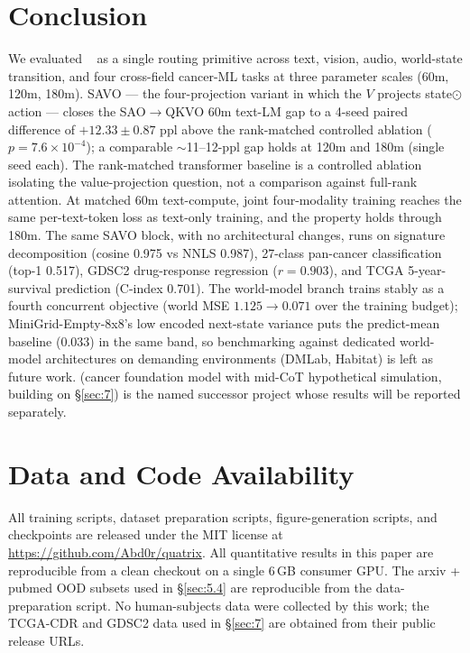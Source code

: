 \section{Conclusion}\label{sec:8}

We evaluated \QC{}~\cite{ref1} as a single routing primitive across text, vision, audio, world-state transition,
and four cross-field cancer-ML tasks at three parameter scales (60m, 120m, 180m). SAVO --- the
four-projection variant in which the $V$ projects state$\odot$action --- closes the SAO$\to$QKVO 60m text-LM
gap to a 4-seed paired difference of $+12.33 \pm 0.87$ ppl above the rank-matched controlled ablation
($p = 7.6 \times 10^{-4}$); a comparable ${\sim}$11--12-ppl gap holds at 120m and 180m (single seed each). The
rank-matched transformer baseline is a controlled ablation isolating the value-projection question, not
a comparison against full-rank attention. At matched 60m text-compute, joint four-modality training
reaches the same per-text-token loss as text-only training, and the property holds through 180m. The same
SAVO block, with no architectural changes, runs on signature decomposition (cosine 0.975 vs NNLS
0.987), 27-class pan-cancer classification (top-1 0.517), GDSC2 drug-response regression ($r = 0.903$),
and TCGA 5-year-survival prediction (C-index 0.701). The world-model branch trains stably as a fourth
concurrent objective (world MSE $1.125 \to 0.071$ over the training budget); MiniGrid-Empty-8x8's low
encoded next-state variance puts the predict-mean baseline (0.033) in the same band, so benchmarking
against dedicated world-model architectures on demanding environments (DMLab, Habitat) is left as
future work. \NanoG{} (cancer foundation model with mid-CoT hypothetical simulation, building on \S\ref{sec:7})
is the named successor project whose results will be reported separately.

\section*{Data and Code Availability}

All training scripts, dataset preparation scripts, figure-generation scripts, and checkpoints are released
under the MIT license at \url{https://github.com/Abd0r/quatrix}. All quantitative results in this paper
are reproducible from a clean checkout on a single 6\,GB consumer GPU. The arxiv + pubmed OOD
subsets used in \S\ref{sec:5.4} are reproducible from the data-preparation script. No human-subjects data were
collected by this work; the TCGA-CDR and GDSC2 data used in \S\ref{sec:7} are obtained from their public
release URLs.

